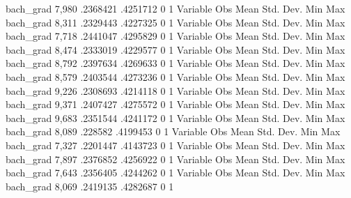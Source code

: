    bach_grad {\VBAR}      7,980    .2368421    .4251712          0          1
{\smallskip}
    Variable {\VBAR}        Obs        Mean    Std. Dev.       Min        Max
   bach_grad {\VBAR}      8,311    .2329443    .4227325          0          1
{\smallskip}
    Variable {\VBAR}        Obs        Mean    Std. Dev.       Min        Max
   bach_grad {\VBAR}      7,718    .2441047    .4295829          0          1
{\smallskip}
    Variable {\VBAR}        Obs        Mean    Std. Dev.       Min        Max
   bach_grad {\VBAR}      8,474    .2333019    .4229577          0          1
{\smallskip}
    Variable {\VBAR}        Obs        Mean    Std. Dev.       Min        Max
   bach_grad {\VBAR}      8,792    .2397634    .4269633          0          1
{\smallskip}
    Variable {\VBAR}        Obs        Mean    Std. Dev.       Min        Max
   bach_grad {\VBAR}      8,579    .2403544    .4273236          0          1
{\smallskip}
    Variable {\VBAR}        Obs        Mean    Std. Dev.       Min        Max
   bach_grad {\VBAR}      9,226    .2308693    .4214118          0          1
{\smallskip}
    Variable {\VBAR}        Obs        Mean    Std. Dev.       Min        Max
   bach_grad {\VBAR}      9,371    .2407427    .4275572          0          1
{\smallskip}
    Variable {\VBAR}        Obs        Mean    Std. Dev.       Min        Max
   bach_grad {\VBAR}      9,683    .2351544    .4241172          0          1
{\smallskip}
    Variable {\VBAR}        Obs        Mean    Std. Dev.       Min        Max
   bach_grad {\VBAR}      8,089     .228582    .4199453          0          1
{\smallskip}
    Variable {\VBAR}        Obs        Mean    Std. Dev.       Min        Max
   bach_grad {\VBAR}      7,327    .2201447    .4143723          0          1
{\smallskip}
    Variable {\VBAR}        Obs        Mean    Std. Dev.       Min        Max
   bach_grad {\VBAR}      7,897    .2376852    .4256922          0          1
{\smallskip}
    Variable {\VBAR}        Obs        Mean    Std. Dev.       Min        Max
   bach_grad {\VBAR}      7,643    .2356405    .4244262          0          1
{\smallskip}
    Variable {\VBAR}        Obs        Mean    Std. Dev.       Min        Max
   bach_grad {\VBAR}      8,069    .2419135    .4282687          0          1
